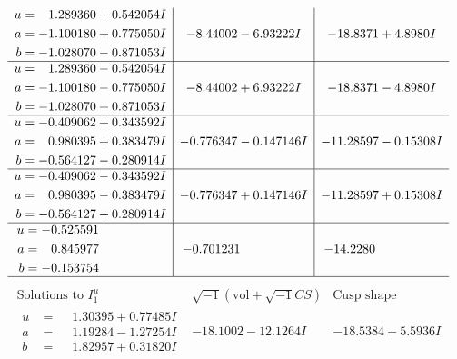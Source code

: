 \documentclass[1p]{elsarticle_modified}
\theoremstyle{definition}
\newcommand{\I}{\sqrt{-1}}
\begin{document}
$$\begin{array}{c|c|c}
\begin{aligned}
u &= \phantom{-}1.289360 + 0.542054 I \\
a &= -1.100180 + 0.775050 I \\
b &= -1.028070 - 0.871053 I\end{aligned}
 & -8.44002 - 6.93222 I & -18.8371 + 4.8980 I \\ \hline\begin{aligned}
u &= \phantom{-}1.289360 - 0.542054 I \\
a &= -1.100180 - 0.775050 I \\
b &= -1.028070 + 0.871053 I\end{aligned}
 & -8.44002 + 6.93222 I & -18.8371 - 4.8980 I \\ \hline\begin{aligned}
u &= -0.409062 + 0.343592 I \\
a &= \phantom{-}0.980395 + 0.383479 I \\
b &= -0.564127 - 0.280914 I\end{aligned}
 & -0.776347 - 0.147146 I & -11.28597 - 0.15308 I \\ \hline\begin{aligned}
u &= -0.409062 - 0.343592 I \\
a &= \phantom{-}0.980395 - 0.383479 I \\
b &= -0.564127 + 0.280914 I\end{aligned}
 & -0.776347 + 0.147146 I & -11.28597 + 0.15308 I \\ \hline\begin{aligned}
u &= -0.525591\phantom{ +0.000000I} \\
a &= \phantom{-}0.845977\phantom{ +0.000000I} \\
b &= -0.153754\phantom{ +0.000000I}\end{aligned}
 & -0.701231\phantom{ +0.000000I} & -14.2280\phantom{ +0.000000I}\\
 \hline 
 \end{array}$$\newpage$$\begin{array}{c|c|c}  
\text{Solutions to }I^u_{1}& \I (\text{vol} + \sqrt{-1}CS) & \text{Cusp shape}\\
 \hline 
\begin{aligned}
u &= \phantom{-}1.30395 + 0.77485 I \\
a &= \phantom{-}1.19284 - 1.27254 I \\
b &= \phantom{-}1.82957 + 0.31820 I\end{aligned}
 & -18.1002 - 12.1264 I & -18.5384 + 5.5936 I \\ \hline\begin{aligned}

\end{aligned}
\end{array}$$
\end{document}
